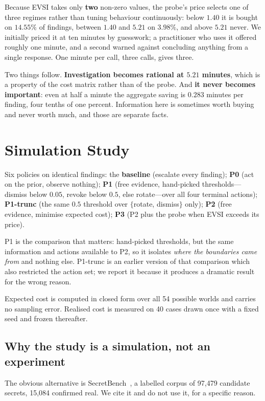 \documentclass{article}
\begin{document}
Because EVSI takes only \textbf{two} non-zero values, the probe's price selects
one of three regimes rather than tuning behaviour continuously: below $1.40$ it
is bought on $14.55\%$ of findings, between $1.40$ and $5.21$ on $3.98\%$, and
above $5.21$ never. We initially priced it at ten minutes by guesswork; a
practitioner who uses it offered roughly one minute, and a second warned against
concluding anything from a single response. One minute per call, three calls,
gives three.

Two things follow. \textbf{Investigation becomes rational at $5.21$ minutes},
which is a property of the cost matrix rather than of the probe. And \textbf{it
never becomes important}: even at half a minute the aggregate saving is $0.283$
minutes per finding, four tenths of one percent. Information here is sometimes
worth buying and never worth much, and those are separate facts.

\section{Simulation Study}

Six policies on identical findings: the \textbf{baseline} (escalate every
finding); \textbf{P0} (act on the prior, observe nothing); \textbf{P1} (free
evidence, hand-picked thresholds---dismiss below $0.05$, revoke below $0.5$,
else rotate---over all four terminal actions); \textbf{P1-trunc} (the same
$0.5$ threshold over $\{$rotate, dismiss$\}$ only); \textbf{P2} (free evidence,
minimise expected cost); \textbf{P3} (P2 plus the probe when EVSI exceeds its
price).

P1 is the comparison that matters: hand-picked thresholds, but the same
information and actions available to P2, so it isolates \emph{where the
boundaries came from} and nothing else. P1-trunc is an earlier version of that
comparison which also restricted the action set; we report it because it
produces a dramatic result for the wrong reason.

Expected cost is computed in closed form over all 54 possible worlds and carries
no sampling error. Realised cost is measured on 40 cases drawn once with a fixed
seed and frozen thereafter.

\subsection{Why the study is a simulation, not an experiment}

The obvious alternative is SecretBench~\cite{basak2023secretbench}, a labelled
corpus of 97{,}479 candidate secrets, 15{,}084 confirmed real. We cite it and do
not use it, for a specific reason.
\end{document}
